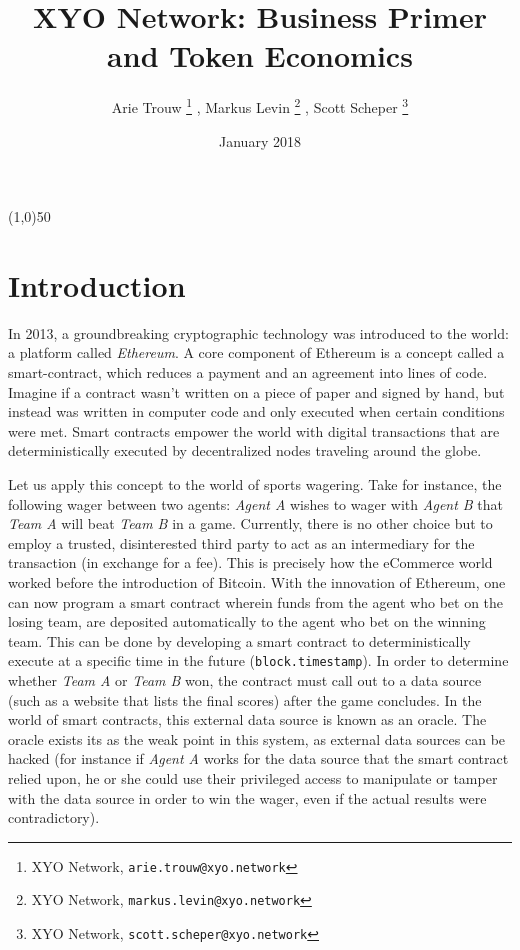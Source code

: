 \documentclass{article}
\title {XYO Network: Business Primer and Token Economics}
\author{
    Arie Trouw
        \thanks{XYO Network, \texttt{arie.trouw@xyo.network}}
    , Markus Levin
        \thanks{XYO Network, \texttt{markus.levin@xyo.network}}
    , Scott Scheper
        \thanks{XYO Network, \texttt{scott.scheper@xyo.network}}
}
\date{January 2018}
\begin{document}
\pagecolor{lightgreen}

\maketitle

\begin{center}
\line(1,0){50}
\end{center}

\section{Introduction}
In 2013, a groundbreaking cryptographic technology was introduced to the world: a platform called \textit{Ethereum}. A core component of Ethereum is a concept called a \gls{smart-contract}, which reduces a payment and an agreement into lines of code. Imagine if a contract wasn't written on a piece of paper and signed by hand, but instead was written in computer code and only executed when certain conditions were met. Smart contracts empower the world with digital transactions that are deterministically executed by decentralized nodes traveling around the globe.

Let us apply this concept to the world of sports wagering. Take for instance, the following wager between two agents: \textit{Agent A} wishes to wager with \textit{Agent B} that \textit{Team A} will beat \textit{Team B} in a game. Currently, there is no other choice but to employ a trusted, disinterested third party to act as an intermediary for the transaction (in exchange for a fee). This is precisely how the eCommerce world worked before the introduction of Bitcoin. With the innovation of Ethereum, one can now program a smart contract wherein funds from the agent who bet on the losing team, are deposited automatically to the agent who bet on the winning team. This can be done by developing a smart contract to deterministically execute at a specific time in the future (\texttt{block.timestamp}). In order to determine whether \textit{Team A} or \textit{Team B} won, the contract must call out to a data source (such as a website that lists the final scores) after the game concludes. In the world of smart contracts, this external data source is known as an \gls{oracle}. The oracle exists its as the weak point in this system, as external data sources can be hacked (for instance if \textit{Agent A} works for the data source that the smart contract relied upon, he or she could use their privileged access to manipulate or tamper with the data source in order to win the wager, even if the actual results were contradictory).
\end{document}
